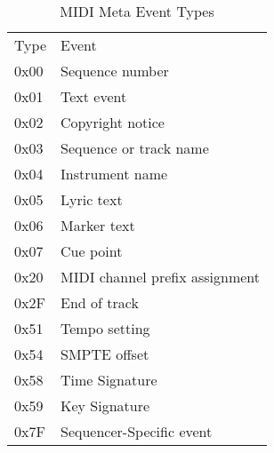    \begin{table}
      \centering
      \caption{MIDI Meta Event Types}
      \label{table:midi_meta_event_types}
      \begin{tabular}{l l}
         Type & Event \\
         0x00 & Sequence number \\
         0x01 & Text event \\
         0x02 & Copyright notice \\
         0x03 & Sequence or track name \\
         0x04 & Instrument name \\
         0x05 & Lyric text \\
         0x06 & Marker text \\
         0x07 & Cue point \\
         0x20 & MIDI channel prefix assignment \\
         0x2F & End of track \\
         0x51 & Tempo setting \\
         0x54 & SMPTE offset \\
         0x58 & Time Signature \\
         0x59 & Key Signature \\
         0x7F & Sequencer-Specific event \\
      \end{tabular}
   \end{table}

